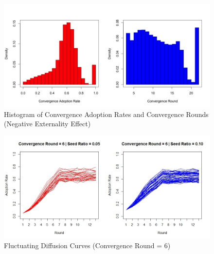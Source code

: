 \documentclass{bmcart}
\begin{document}
\begin{backmatter}
\begin{figure}[h!]
\centering
\includegraphics[scale=0.35]{Hist_conv_adp_and_round_neg.jpg}
\caption{Histogram of Convergence Adoption Rates and Convergence Rounds (Negative Externality Effect)}
\label{Fig: hist conv adp and round neg}
\end{figure}

\begin{figure}[h!]
\centering
\includegraphics[scale=0.35]{Fluctuating_curves_round_6_neg.jpg}
\caption{Fluctuating Diffusion Curves (Convergence Round = 6)}
\label{Fig: fluctuating curves round=6}
\end{figure}




\end{backmatter}
\end{document}
